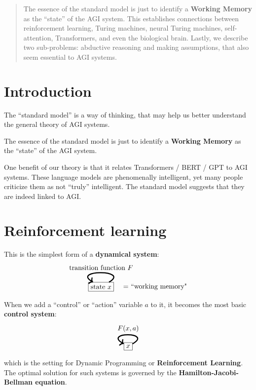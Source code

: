\begin{abstract}
The essence of the standard model is just to identify a \textbf{Working Memory} as the ``state'' of the AGI system.  This establishes connections between reinforcement learning, Turing machines, neural Turing machines, self-attention, Transformers, and even the biological brain.  Lastly, we describe two sub-problems: abductive reasoning and making assumptions, that also seem essential to AGI systems.
\end{abstract}


\setcounter{section}{-1}
\section{Introduction}

The ``standard model'' is a way of thinking, that may help us better understand the general theory of AGI systems.

The essence of the standard model is just to identify a \textbf{Working Memory} as the ``state'' of the AGI system.

One benefit of our theory is that it relates Transformers / BERT / GPT to AGI systems.  These language models are phenomenally intelligent, yet many people criticize them as not ``truly'' intelligent.  The standard model suggests that they are indeed linked to AGI.

\section{Reinforcement learning}

This is the simplest form of a \textbf{dynamical system}:
\begin{equation}
\begin{tikzpicture}[->]
\node[rectangle,draw,label=0:{{$\quad =$} ``working memory"}] (C) {state $x$};
\path (C) edge [out=30,in=150,looseness=4,ultra thick] node [above] {transition function $F$} (C);
\end{tikzpicture}
\end{equation}
When we add a ``control'' or ``action'' variable $a$ to it, it becomes the most basic  \textbf{control system}:
\begin{equation}
\begin{tikzpicture}[->]
\node[rectangle,draw] (C) {$x$};
\path (C) edge [out=30,in=150,looseness=7,ultra thick] node [above] {$F(x, a)$} (C);
\end{tikzpicture}
\end{equation}
which is the setting for Dynamic Programming or \textbf{Reinforcement Learning}.  The optimal solution for such systems is governed by the \textbf{Hamilton-Jacobi-Bellman equation}.

